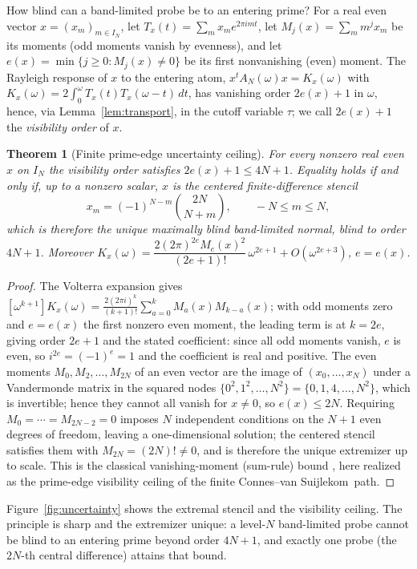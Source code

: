 \documentclass[11pt]{article}
\theoremstyle{plain}
\newtheorem{theorem}{Theorem}[section]
\theoremstyle{definition}
\theoremstyle{remark}
\newcommand{\cvs}{Connes--van Suijlekom}
\newcommand{\dd}{\,d}
\begin{document}
How blind can a band-limited probe be to an entering prime? For a real even
vector $x=(x_m)_{m\in I_N}$, let $T_x(t)=\sum_m x_m e^{2\pi imt}$, let
$M_j(x)=\sum_m m^jx_m$ be its moments (odd moments vanish by evenness), and let
$e(x)=\min\{j\ge0:M_j(x)\ne0\}$ be its first nonvanishing (even) moment. The
Rayleigh response of $x$ to the entering atom, $x^tA_N(\omega)x=K_x(\omega)$ with
$K_x(\omega)=2\int_0^\omega T_x(t)T_x(\omega-t)\dd t$, has vanishing order
$2e(x)+1$ in $\omega$, hence, via Lemma~\ref{lem:transport}, in the cutoff
variable $\tau$; we call $2e(x)+1$ the \emph{visibility order} of $x$.

\begin{theorem}[Finite prime-edge uncertainty ceiling]\label{thm:uncertainty}
For every nonzero real even $x$ on $I_N$ the visibility order satisfies
$2e(x)+1\le 4N+1$. Equality holds if and only if, up to a nonzero scalar, $x$ is
the centered finite-difference stencil
\[
        x_m=(-1)^{N-m}\binom{2N}{N+m},\qquad -N\le m\le N,
\]
which is therefore the unique maximally blind band-limited normal, blind to order
$4N+1$. Moreover $K_x(\omega)=\dfrac{2(2\pi)^{2e}M_e(x)^2}{(2e+1)!}\,
\omega^{2e+1}+O(\omega^{2e+3})$, $e=e(x)$.
\end{theorem}

\begin{proof}
The Volterra expansion gives
$[\omega^{k+1}]K_x(\omega)=\frac{2(2\pi i)^k}{(k+1)!}\sum_{a=0}^kM_a(x)M_{k-a}(x)$;
with odd moments zero and $e=e(x)$ the first nonzero even moment, the leading
term is at $k=2e$, giving order $2e+1$ and the stated coefficient: since all odd
moments vanish, $e$ is even, so $i^{2e}=(-1)^e=1$ and the coefficient is real and
positive. The even moments $M_0,M_2,\dots,M_{2N}$ of an even vector are the image
of $(x_0,\dots,x_N)$ under a Vandermonde matrix in the squared nodes
$\{0^2,1^2,\dots,N^2\}=\{0,1,4,\dots,N^2\}$, which is invertible; hence they
cannot all vanish for $x\ne0$, so $e(x)\le 2N$. Requiring $M_0=\cdots=M_{2N-2}=0$ imposes $N$ independent
conditions on the $N+1$ even degrees of freedom, leaving a one-dimensional
solution; the centered stencil satisfies them with $M_{2N}=(2N)!\ne0$, and is
therefore the unique extremizer up to scale. This is the classical
vanishing-moment (sum-rule) bound \cite{Daubechies1992}, here realized as the
prime-edge visibility ceiling of the finite \cvs\ path.
\end{proof}

Figure~\ref{fig:uncertainty} shows the extremal stencil and the visibility
ceiling. The principle is sharp and the extremizer unique: a level-$N$
band-limited probe cannot be blind to an entering prime beyond order $4N+1$, and
exactly one probe (the $2N$-th central difference) attains that bound.
\end{document}
